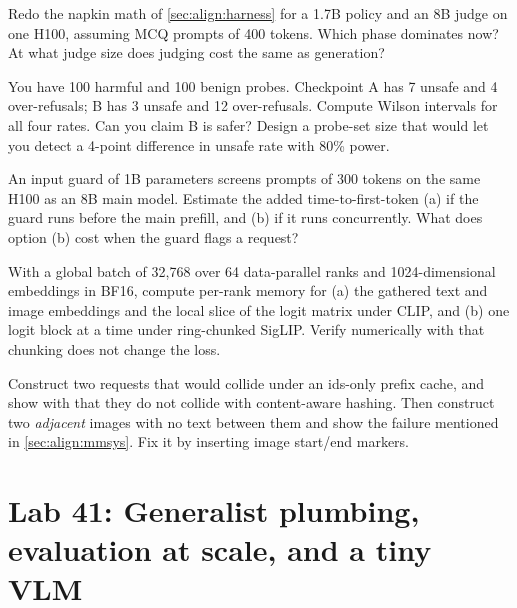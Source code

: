 \begin{exercise}
Redo the napkin math of \cref{sec:align:harness} for a 1.7B policy and an 8B judge on one H100,
assuming MCQ prompts of 400 tokens. Which phase dominates now? At what judge size does judging cost the same
as generation?
\end{exercise}

\begin{exercise}
You have 100 harmful and 100 benign probes. Checkpoint A has 7 unsafe and 4 over-refusals; B has 3 unsafe
and 12 over-refusals. Compute Wilson intervals for all four rates. Can you claim B is safer? Design a
probe-set size that would let you detect a 4-point difference in unsafe rate with 80\% power.
\end{exercise}

\begin{exercise}
An input guard of 1B parameters screens prompts of 300 tokens on the same H100 as an 8B main model. Estimate
the added time-to-first-token (a) if the guard runs before the main prefill, and (b) if it runs
concurrently. What does option (b) cost when the guard flags a request?
\end{exercise}

\begin{exercise}
With a global batch of 32{,}768 over 64 data-parallel ranks and 1024-dimensional embeddings in BF16,
compute per-rank memory for (a) the gathered text and image embeddings and the local slice of the logit matrix
under CLIP, and (b) one logit block at a time under ring-chunked SigLIP. Verify numerically with
 that chunking does not change the loss.
\end{exercise}

\begin{exercise}
Construct two requests that would collide under an ids-only prefix cache, and show with
 that they do not collide with content-aware hashing. Then construct two
\emph{adjacent} images with no text between them and show the failure mentioned in
\cref{sec:align:mmsys}. Fix it by inserting image start/end markers.
\end{exercise}

\section{Lab 41: Generalist plumbing, evaluation at scale, and a tiny VLM}\label{sec:align:lab}

